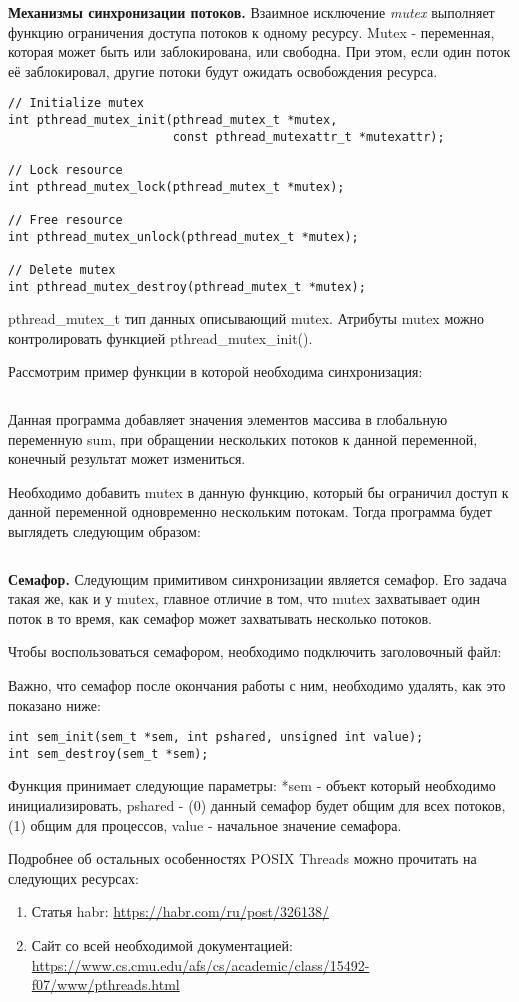\textbf{Механизмы синхронизации потоков.} Взаимное исключение \textit{mu\-tex} выполняет функцию ограничения доступа потоков к одному ресурсу. Mutex - переменная, которая может быть или заблокирована, или свободна. При этом, если один поток её заблокировал, другие потоки будут ожидать освобождения ресурса.

\begin{verbatim}
// Initialize mutex
int pthread_mutex_init(pthread_mutex_t *mutex, 
                       const pthread_mutexattr_t *mutexattr);

// Lock resource
int pthread_mutex_lock(pthread_mutex_t *mutex);

// Free resource
int pthread_mutex_unlock(pthread_mutex_t *mutex);

// Delete mutex
int pthread_mutex_destroy(pthread_mutex_t *mutex);
\end{verbatim}

pthread\_mutex\_t тип данных описывающий mutex. Атрибуты mu\-tex можно контролировать функцией
pthread\_mutex\_init().

Рассмотрим пример функции в которой необходима синхронизация:

\inputminted{c++}{listings/WithoutMutex.c}

Данная программа добавляет значения элементов массива в глобальную переменную sum, при обращении нескольких потоков к данной переменной, конечный результат может измениться.

Необходимо добавить mutex в данную функцию, который бы ограничил доступ к данной переменной одновременно нескольким потокам. Тогда программа будет выглядеть следующим образом:

\inputminted{c++}{listings/WithMutex.c}

\textbf{Семафор.} Следующим примитивом синхронизации является семафор. Его задача такая же, как и у mutex, главное отличие в том, что mutex захватывает один поток в то время, как семафор может захватывать несколько потоков.

Чтобы воспользоваться семафором, необходимо подключить заголовочный файл:

Важно, что семафор после окончания работы с ним, необходимо удалять, как это показано ниже:

\begin{verbatim}
int sem_init(sem_t *sem, int pshared, unsigned int value);
int sem_destroy(sem_t *sem);
\end{verbatim}

Функция  принимает следующие параметры: *sem - объект который необходимо инициализировать, pshared - (0) данный семафор будет общим для всех потоков, (1) общим для процессов, value - начальное значение семафора.

Подробнее об остальных особенностях POSIX Threads можно прочитать на следующих ресурсах:

\begin{enumerate}
    \item Статья habr: \url{https://habr.com/ru/post/326138/}
    \item Сайт со всей необходимой документацией: \url{https://www.cs.cmu.edu/afs/cs/academic/class/15492-f07/www/pthreads.html}
\end{enumerate}
